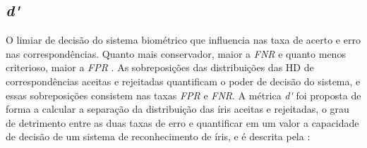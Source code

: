 
\FloatBarrier

\subsection{\textit{\acrfull{d'}}}\label{sec:experimentos:daugman}

\par O limiar de decisão do sistema biométrico que influencia nas taxa de acerto e erro nas correspondências. Quanto mais conservador, maior a \textit{\acrshort{FNR}} e quanto menos criterioso, maior a \textit{\acrshort{FPR}} \cite{daugman2000}. As sobreposições das distribuições das \acrlong{HD} de correspondências aceitas e rejeitadas quantificam o poder de decisão do sistema, e essas sobreposições consistem nas taxas \textit{\acrshort{FPR}} e \textit{\acrshort{FNR}}. A métrica \textit{\acrshort{d'}} foi proposta de forma a calcular a separação da distribuição das íris aceitas e rejeitadas, o grau de detrimento entre as duas taxas de erro e quantificar em um valor a capacidade de decisão de um sistema de reconhecimento de íris, e é descrita pela  \cite{daugman2000}:

